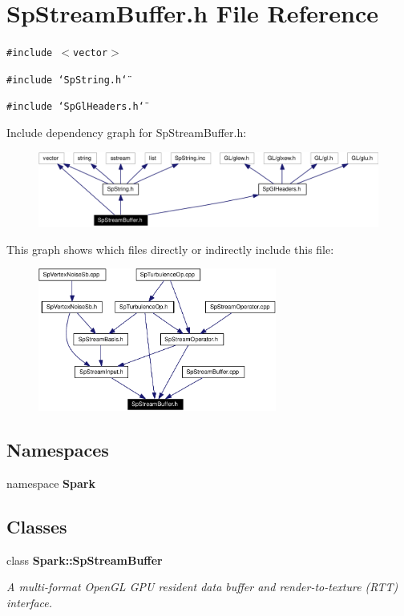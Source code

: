 \section{Sp\-Stream\-Buffer.h File Reference}
\label{SpStreamBuffer_8h}
{\tt \#include $<$vector$>$}\par
{\tt \#include \char`\"{}Sp\-String.h\char`\"{}}\par
{\tt \#include \char`\"{}Sp\-Gl\-Headers.h\char`\"{}}\par


Include dependency graph for Sp\-Stream\-Buffer.h:\begin{figure}[H]
\begin{center}
\leavevmode
\includegraphics[width=321pt]{SpStreamBuffer_8h__incl}
\end{center}
\end{figure}


This graph shows which files directly or indirectly include this file:\begin{figure}[H]
\begin{center}
\leavevmode
\includegraphics[width=222pt]{SpStreamBuffer_8h__dep__incl}
\end{center}
\end{figure}
\subsection*{Namespaces}
\begin{CompactItemize}
\item 
namespace {\bf Spark}
\end{CompactItemize}
\subsection*{Classes}
\begin{CompactItemize}
\item 
class {\bf Spark::Sp\-Stream\-Buffer}
\begin{CompactList}\small\item\em A multi-format Open\-GL GPU resident data buffer and render-to-texture (RTT) interface. \item\end{CompactList}\end{CompactItemize}
